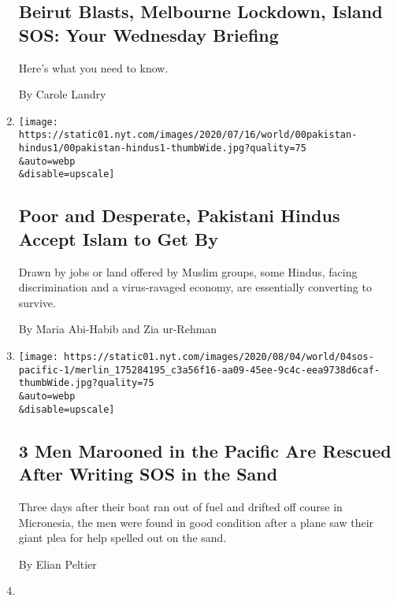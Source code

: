 \begin{enumerate}
{  \subsection{Beirut Blasts, Melbourne Lockdown, Island SOS: Your
  Wednesday
  Briefing}\label{beirut-blasts-melbourne-lockdown-island-sos-your-wednesday-briefing}}

  Here's what you need to know.

  By Carole Landry
\item
  \href{/2020/08/04/world/asia/pakistan-hindu-conversion.html}{}

  \texttt{[image: https://static01.nyt.com/images/2020/07/16/world/00pakistan-hindus1/00pakistan-hindus1-thumbWide.jpg?quality=75\\\&auto=webp\\\&disable=upscale]}

  \hypertarget{poor-and-desperate-pakistani-hindus-accept-islam-to-get-by}{%
  \subsection{Poor and Desperate, Pakistani Hindus Accept Islam to Get
  By}\label{poor-and-desperate-pakistani-hindus-accept-islam-to-get-by}}

  Drawn by jobs or land offered by Muslim groups, some Hindus, facing
  discrimination and a virus-ravaged economy, are essentially converting
  to survive.

  By Maria Abi-Habib and Zia ur-Rehman
\item
  \href{/2020/08/04/world/australia/sos-pacific-island.html}{}

  \texttt{[image: https://static01.nyt.com/images/2020/08/04/world/04sos-pacific-1/merlin\_175284195\_c3a56f16-aa09-45ee-9c4c-eea9738d6caf-thumbWide.jpg?quality=75\\\&auto=webp\\\&disable=upscale]}

  \hypertarget{3-men-marooned-in-the-pacific-are-rescued-after-writing-sos-in-the-sand}{%
  \subsection{3 Men Marooned in the Pacific Are Rescued After Writing
  SOS in the
  Sand}\label{3-men-marooned-in-the-pacific-are-rescued-after-writing-sos-in-the-sand}}

  Three days after their boat ran out of fuel and drifted off course in
  Micronesia, the men were found in good condition after a plane saw
  their giant plea for help spelled out on the sand.

  By Elian Peltier
\item
  \href{/2020/08/04/magazine/behrouz-boochani-australia.html}{}


\end{enumerate}
